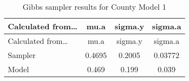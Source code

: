 \documentclass[]{article}
\begin{document}
\begin{longtable}[]{@{}lccc@{}}
\caption{Gibbs sampler results for County Model 1
\label{tab:gibbs_1}}\tabularnewline
\toprule
\begin{minipage}[b]{0.26\columnwidth}\raggedright\strut
Calculated from\ldots{}\strut
\end{minipage} & \begin{minipage}[b]{0.11\columnwidth}\centering\strut
mu.a\strut
\end{minipage} & \begin{minipage}[b]{0.12\columnwidth}\centering\strut
sigma.y\strut
\end{minipage} & \begin{minipage}[b]{0.12\columnwidth}\centering\strut
sigma.a\strut
\end{minipage}\tabularnewline
\midrule
\endfirsthead
\toprule
\begin{minipage}[b]{0.26\columnwidth}\raggedright\strut
Calculated from\ldots{}\strut
\end{minipage} & \begin{minipage}[b]{0.11\columnwidth}\centering\strut
mu.a\strut
\end{minipage} & \begin{minipage}[b]{0.12\columnwidth}\centering\strut
sigma.y\strut
\end{minipage} & \begin{minipage}[b]{0.12\columnwidth}\centering\strut
sigma.a\strut
\end{minipage}\tabularnewline
\midrule
\endhead
\begin{minipage}[t]{0.26\columnwidth}\raggedright\strut
Sampler\strut
\end{minipage} & \begin{minipage}[t]{0.11\columnwidth}\centering\strut
0.4695\strut
\end{minipage} & \begin{minipage}[t]{0.12\columnwidth}\centering\strut
0.2005\strut
\end{minipage} & \begin{minipage}[t]{0.12\columnwidth}\centering\strut
0.03772\strut
\end{minipage}\tabularnewline
\begin{minipage}[t]{0.26\columnwidth}\raggedright\strut
Model\strut
\end{minipage} & \begin{minipage}[t]{0.11\columnwidth}\centering\strut
0.469\strut
\end{minipage} & \begin{minipage}[t]{0.12\columnwidth}\centering\strut
0.199\strut
\end{minipage} & \begin{minipage}[t]{0.12\columnwidth}\centering\strut
0.039\strut
\end{minipage}\tabularnewline
\bottomrule
\end{longtable}
\end{document}
